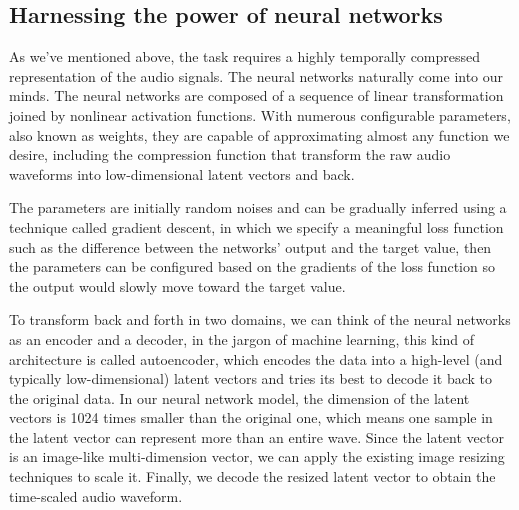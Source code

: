\documentclass[12pt]{article}
\begin{document}
\subsection{Harnessing the power of neural networks}
As we've mentioned above, the task requires a highly temporally compressed representation of the audio signals. The neural networks naturally come into our minds. The neural networks are composed of a sequence of linear transformation joined by nonlinear activation functions. With numerous configurable parameters, also known as weights, they are capable of approximating almost any function we desire, including the compression function that transform the raw audio waveforms into low-dimensional latent vectors and back.

The parameters are initially random noises and can be gradually inferred using a technique called gradient descent, in which we specify a meaningful loss function such as the difference between the networks' output and the target value, then the parameters can be configured based on the gradients of the loss function so the output would slowly move toward the target value.

To transform back and forth in two domains, we can think of the neural networks as an encoder and a decoder, in the jargon of machine learning, this kind of architecture is called autoencoder, which encodes the data into a high-level (and typically low-dimensional) latent vectors and tries its best to decode it back to the original data. In our neural network model, the dimension of the latent vectors is 1024 times smaller than the original one, which means one sample in the latent vector can represent more than an entire wave. Since the latent vector is an image-like multi-dimension vector, we can apply the existing image resizing techniques to scale it. Finally, we decode the resized latent vector to obtain the time-scaled audio waveform.


\end{document}
